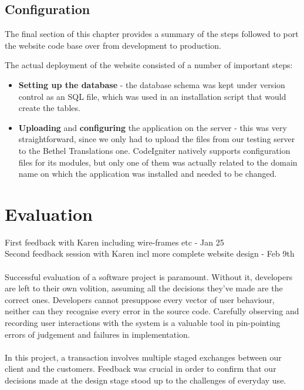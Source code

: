 \documentclass{l3proj}
\begin{document}
\section{Configuration}
The final section of this chapter provides a summary of the steps followed to port the website code base over
from development to production.

The actual deployment of the website consisted of a number of important steps:
\begin{itemize}
	\item \textbf{Setting up the database} - the database schema was kept under
		version
		control as an SQL file, which was used in an installation script that
		would create the tables.
	\item \textbf{Uploading} and \textbf{configuring} the application on the
		server - this was
		very straightforward, since we only had to upload the files from our
		testing server to the Bethel Translations one. CodeIgniter natively 
		supports configuration files for its modules, but only one of them
		was actually related to the domain name on which the application was
		installed and needed to be changed.
\end{itemize}

\chapter{Evaluation}
\label{chap:eval}
First feedback with Karen including wire-frames etc - Jan 25\\
Second feedback session with Karen incl more complete website design - Feb 9th\\
\\
Successful evaluation of a software project is paramount. Without it,
developers are left to their own volition, assuming all the decisions they've
made are the correct ones. Developers cannot presuppose every vector of user
behaviour, neither can they recognise every error in the source code. Carefully
observing and recording user interactions with the system is a valuable tool
in pin-pointing errors of judgement and failures in implementation.\\
\\
In this project, a transaction involves multiple staged exchanges
between our client and the customers. Feedback was crucial in order to confirm
that our decisions made at the design stage stood up to the challenges of
everyday use.
\end{document}
